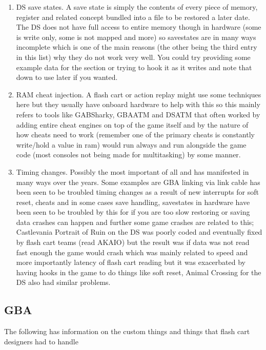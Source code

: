 \documentclass[
]{book}
\providecommand{\tightlist}{%
  \setlength{\itemsep}{0pt}\setlength{\parskip}{0pt}}
\begin{document}
\begin{enumerate}
\def\labelenumi{\arabic{enumi}.}
\tightlist
\item
  DS save states. A save state is simply the contents of every piece of memory, register and related concept bundled into a file to be restored a later date. The DS does not have full access to entire memory though in hardware (some is write only, some is not mapped and more) so savestates are in many ways incomplete which is one of the main reasons (the other being the third entry in this list) why they do not work very well. You could try providing some example data for the section or trying to hook it as it writes and note that down to use later if you wanted.
\item
  RAM cheat injection. A flash cart or action replay might use some techniques here but they usually have onboard hardware to help with this so this mainly refers to tools like GABSharky, GBAATM and DSATM that often worked by adding entire cheat engines on top of the game itself and by the nature of how cheats need to work (remember one of the primary cheats is constantly write/hold a value in ram) would run always and run alongside the game code (most consoles not being made for multitasking) by some manner.
\item
  Timing changes. Possibly the most important of all and has manifested in many ways over the years. Some examples are GBA linking via link cable has been seen to be troubled timing changes as a result of new interrupts for soft reset, cheats and in some cases save handling, savestates in hardware have been seen to be troubled by this for if you are too slow restoring or saving data crashes can happen and further some game crashes are related to this; Castlevania Portrait of Ruin on the DS was poorly coded and eventually fixed by flash cart teams (read AKAIO) but the result was if data was not read fast enough the game would crash which was mainly related to speed and more importantly latency of flash cart reading but it was exacerbated by having hooks in the game to do things like soft reset, Animal Crossing for the DS also had similar problems.
\end{enumerate}

\hypertarget{gba-1}{%
\subsection{GBA}\label{gba-1}}

The following has information on the custom things and things that flash cart designers had to handle
\end{document}

